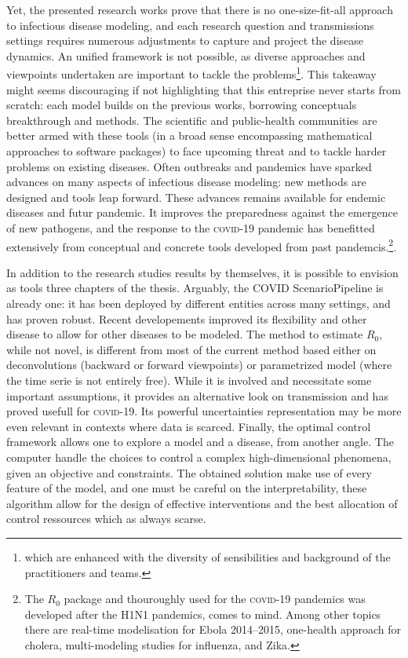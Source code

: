 Yet, the presented research works prove that there is no one-size-fit-all approach to infectious disease modeling, and each research question and transmissions settings requires numerous adjustments to capture and project the disease dynamics. An unified framework is not possible, as diverse approaches and viewpoints undertaken are important to tackle the problems\footnote{which are enhanced with the diversity of sensibilities and background of the practitioners and teams.}.  
  This takeaway might seems discouraging if not highlighting that this entreprise never starts from scratch: each model builds on the previous works, borrowing conceptuals breakthrough and methods. The scientific and public-health communities are better armed with these tools (in a broad sense encompassing \eg mathematical approaches to software packages) to face upcoming threat and to tackle harder problems on existing diseases. Often outbreaks and pandemics have sparked advances on many aspects of infectious disease modeling: new methods are designed and tools leap forward. These advances remains available for endemic diseases and futur pandemic. It improves the preparedness against the emergence of new pathogens, and the response to the \textsc{covid}-19 pandemic has benefitted extensively from conceptual and concrete tools developed from past pandemcis.\footnote{The $R_0$ package and thouroughly used for the \textsc{covid}-19 pandemics was developed after the H1N1 pandemics, comes to mind. Among other topics there are \eg real-time modelisation for Ebola 2014--2015, one-health approach for cholera, multi-modeling studies for influenza, and Zika.}. 
  
  In addition to the research studies results by themselves, it is possible to envision as tools three chapters of the thesis. Arguably, the COVID ScenarioPipeline is already one: it has been deployed by different entities across many settings, and has proven robust. Recent developements improved its flexibility and other disease  to allow for other diseases to be modeled. The method to estimate $R_0$, while not novel, is different from most of the current method based either on deconvolutions (backward or forward viewpoints) or parametrized model (where the time serie is not entirely free). While it is involved and necessitate some important assumptions, it provides an alternative look on transmission and has proved usefull for \textsc{covid}-19. Its powerful uncertainties representation may be more even relevant in contexts where data is scarced. 
Finally, the optimal control framework allows one to explore a model and a disease, from another angle. The computer handle the choices to control a complex high-dimensional  phenomena, given an objective and constraints. The obtained solution make use of every feature of the model, and one must be careful on the interpretability, these algorithm allow for the design of effective interventions and the best allocation of control ressources which as always scarse.

